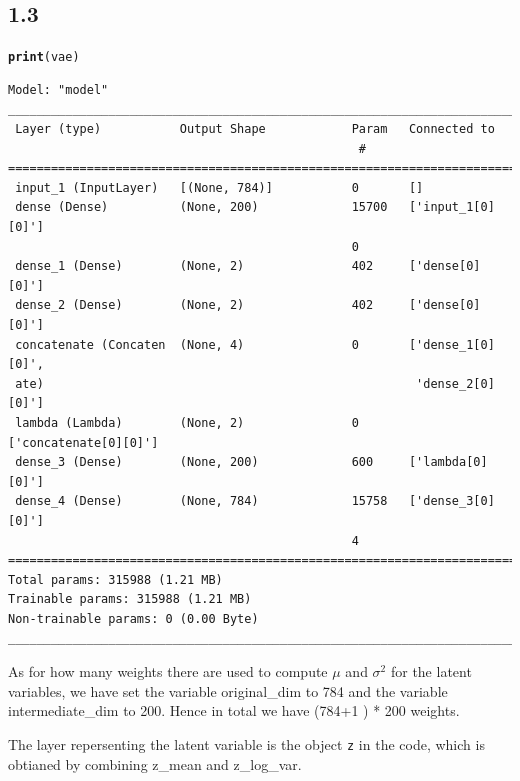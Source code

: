 \documentclass[10pt, a4paper, english]{article}\usepackage[]{graphicx}\usepackage[dvipsnames]{xcolor}
\makeatletter
\newcommand{\hlstd}[1]{\textcolor[rgb]{0.345,0.345,0.345}{#1}}%
\newcommand{\hlkwd}[1]{\textcolor[rgb]{0.737,0.353,0.396}{\textbf{#1}}}%
\newenvironment{kframe}{%
 \def\at@end@of@kframe{}%
 \ifinner\ifhmode%
  \def\at@end@of@kframe{\end{minipage}}%
  \begin{minipage}{\columnwidth}%
 \fi\fi%
 \def\FrameCommand##1{\hskip\@totalleftmargin \hskip-\fboxsep
 \colorbox{shadecolor}{##1}\hskip-\fboxsep
     \hskip-\linewidth \hskip-\@totalleftmargin \hskip\columnwidth}%
 \MakeFramed {\advance\hsize-\width
   \@totalleftmargin\z@ \linewidth\hsize
   \@setminipage}}%
 {\par\unskip\endMakeFramed%
 \at@end@of@kframe}
\newenvironment{knitrout}{}{} %
\makeatother
\begin{document}
\subsection{1.3}
\begin{knitrout}
\color{fgcolor}\begin{kframe}
\begin{alltt}
\hlkwd{print}\hlstd{(vae)}
\end{alltt}
\begin{verbatim}
Model: "model"
________________________________________________________________________________
 Layer (type)           Output Shape            Param   Connected to            
                                                 #                              
================================================================================
 input_1 (InputLayer)   [(None, 784)]           0       []                      
 dense (Dense)          (None, 200)             15700   ['input_1[0][0]']       
                                                0                               
 dense_1 (Dense)        (None, 2)               402     ['dense[0][0]']         
 dense_2 (Dense)        (None, 2)               402     ['dense[0][0]']         
 concatenate (Concaten  (None, 4)               0       ['dense_1[0][0]',       
 ate)                                                    'dense_2[0][0]']       
 lambda (Lambda)        (None, 2)               0       ['concatenate[0][0]']   
 dense_3 (Dense)        (None, 200)             600     ['lambda[0][0]']        
 dense_4 (Dense)        (None, 784)             15758   ['dense_3[0][0]']       
                                                4                               
================================================================================
Total params: 315988 (1.21 MB)
Trainable params: 315988 (1.21 MB)
Non-trainable params: 0 (0.00 Byte)
________________________________________________________________________________
\end{verbatim}
\end{kframe}
\end{knitrout}

As for how many weights there are used to compute $\mu$ and $\sigma^2$ for the latent variables, we have set the variable original\_dim to 784 and the variable intermediate\_dim to 200. Hence in total we have (784+1 ) * 200 weights.  

The layer repersenting the latent variable is the object \texttt{z} in the code, which is obtianed by combining  z\_mean and z\_log\_var. 
\end{document}
